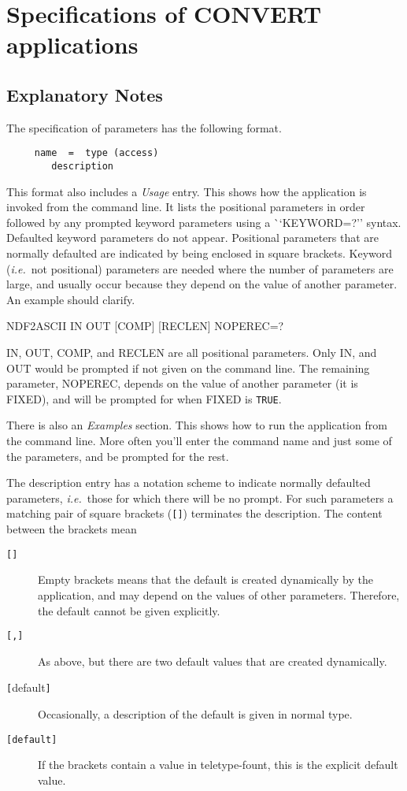\newpage
\appendix

\section{Specifications of CONVERT applications}
\label{ap:full}
\subsection{Explanatory Notes}
The specification of parameters has the following format.

\begin{verbatim}
     name  =  type (access)
        description
\end{verbatim}
This format also includes a {\em Usage\/} entry.  This shows how the
application is invoked from the command line.   It lists the positional
parameters in order followed by any prompted keyword parameters using 
a {\mbox ``KEYWORD=?''} syntax.  Defaulted
keyword parameters do not appear.  Positional parameters
that are normally defaulted are indicated by being enclosed in square
brackets.   Keyword ({\it i.e.}\ not positional) parameters are needed 
where the number of parameters are large, and usually occur because
they depend on the value of another parameter.  An example should clarify.
\bigskip

{\ssttt \hspace*{1.0em}
        NDF2ASCII IN OUT [COMP] [RECLEN] NOPEREC=?
}
\bigskip

IN, OUT, COMP, and RECLEN are all positional
parameters.  Only IN, and OUT would be prompted if not given
on the command line. The remaining parameter, NOPEREC, depends on the
value of another parameter (it is FIXED), and will be prompted for when
FIXED is {\tt TRUE}. 

There is also an {\em Examples\/} section.  This shows how to run the
application from the command line.  More often you'll enter the
command name and just some of the parameters, and be prompted for
the rest.

The description entry has a notation scheme to indicate 
normally defaulted parameters, {\it i.e.}\ those for which there will
be no prompt.
For such parameters a matching pair of square brackets ({\tt []})
terminates the description.  The content between the brackets mean
\begin{description}
\item[{\tt []}]
Empty brackets means that the default is created dynamically
by the application, and may depend on the values of other parameters.
Therefore, the default cannot be given explicitly.
\item[{\tt [,]}]
As above, but there are two default values that are created dynamically.
\item[{\tt [}{\rm default}{\tt ]}]
Occasionally, a description of the default is given in normal type.
\item[{\tt [default]}]
If the brackets contain a value in teletype-fount, this is the explicit
default value.
\end{description}

